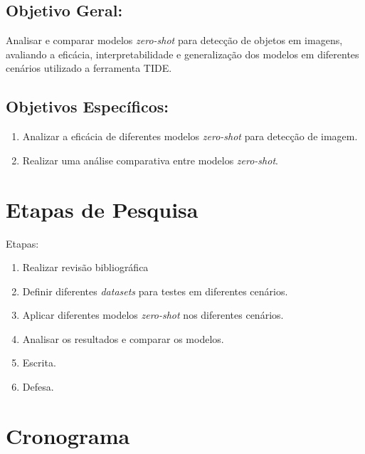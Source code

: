 \documentclass[openany, a4paper,12pt, oneside]{article}
\begin{document}
\subsection{Objetivo Geral:}

Analisar e comparar modelos \textit{zero-shot} para detecção de objetos em imagens, avaliando a eficácia, interpretabilidade e generalização dos modelos em diferentes cenários utilizado a ferramenta TIDE.

\subsection{Objetivos Espec\'{i}ficos:}
\begin{enumerate}
  \item Analizar a efic\'{a}cia de diferentes modelos \textit{zero-shot} para detec\c{c}\~{a}o de imagem.
  \item Realizar uma an\'{a}lise comparativa entre modelos \textit{zero-shot}.
\end{enumerate}

\section{Etapas de Pesquisa}

Etapas:
\begin{enumerate}
  \item Realizar revis\~{a}o bibliogr\'{a}fica
  \item Definir diferentes \textit{datasets} para testes em diferentes cen\'{a}rios.
  \item Aplicar diferentes modelos \textit{zero-shot} nos diferentes cen\'{a}rios.
  \item Analisar os resultados e comparar os modelos.
  \item Escrita.
  \item Defesa.
\end{enumerate}

\section{Cronograma}
\end{document}

